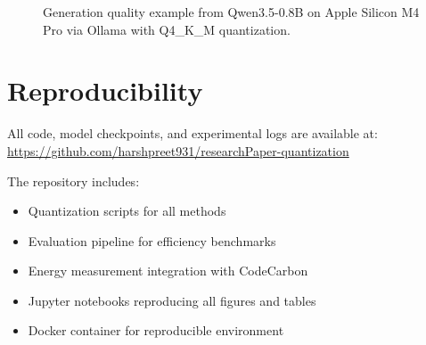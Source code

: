 \documentclass[11pt,a4paper]{article}
\begin{document}
\begin{figure}[h]
\centering
{}
\caption{Generation quality example from Qwen3.5-0.8B on Apple Silicon M4 Pro via Ollama with Q4\_K\_M quantization.}
\label{fig:examples}
\end{figure}

\section{Reproducibility}

All code, model checkpoints, and experimental logs are available at: \url{https://github.com/harshpreet931/researchPaper-quantization}

The repository includes:
\begin{itemize}[leftmargin=*,nosep]
    \item Quantization scripts for all methods
    \item Evaluation pipeline for efficiency benchmarks
    \item Energy measurement integration with CodeCarbon
    \item Jupyter notebooks reproducing all figures and tables
    \item Docker container for reproducible environment
\end{itemize}
\end{document}
